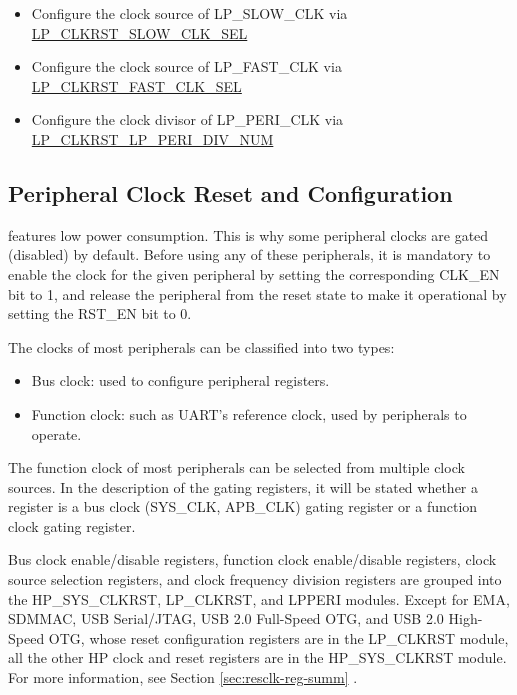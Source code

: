\documentclass[main\_\_EN.tex]{subfiles}
\begin{document}
\begin{itemize}
    \item Configure the clock source of LP\_SLOW\_CLK via \hyperref[fielddesc:LPCLKRSTSLOWCLKSEL]{LP\_CLKRST\_SLOW\_CLK\_SEL}
    \item Configure the clock source of LP\_FAST\_CLK via \hyperref[fielddesc:LPCLKRSTFASTCLKSEL]{LP\_CLKRST\_FAST\_CLK\_SEL}
    \item Configure the clock divisor of LP\_PERI\_CLK via \hyperref[fielddesc:LPCLKRSTLPPERIDIVNUM]{LP\_CLKRST\_LP\_PERI\_DIV\_NUM}
\end{itemize}

\subsection{Peripheral Clock Reset and Configuration}

\begin{importantlisting}
\vspace{-0.5em}

\chipname{} features low power consumption. This is why some peripheral clocks are gated (disabled) by default. Before using any of these peripherals, it is mandatory to enable the clock for the given peripheral by setting the corresponding CLK\_EN bit to 1, and release the peripheral from the reset state to make it operational by setting the RST\_EN bit to 0.
\end{importantlisting}

The clocks of most peripherals can be classified into two types:
\begin{itemize}
    \item Bus clock: used to configure peripheral registers.
    \item Function clock: such as UART's reference clock, used by peripherals to operate.
\end{itemize}

The function clock of most peripherals can be selected from multiple clock sources. In the description of the gating registers, it will be stated whether a register is a bus clock (SYS\_CLK, APB\_CLK) gating register or a function clock gating register.

Bus clock enable/disable registers, function clock enable/disable registers, clock source selection registers, and clock frequency division registers are grouped into the HP\_SYS\_CLKRST, LP\_CLKRST, and LPPERI modules. Except for EMA, SDMMAC, USB Serial/JTAG, USB 2.0 Full-Speed OTG, and USB 2.0 High-Speed OTG, whose reset configuration registers are in the LP\_CLKRST module, all the other HP clock and reset registers are in the HP\_SYS\_CLKRST module. For more information, see Section \ref{sec:resclk-reg-summ} \textit{}.
\end{document}
